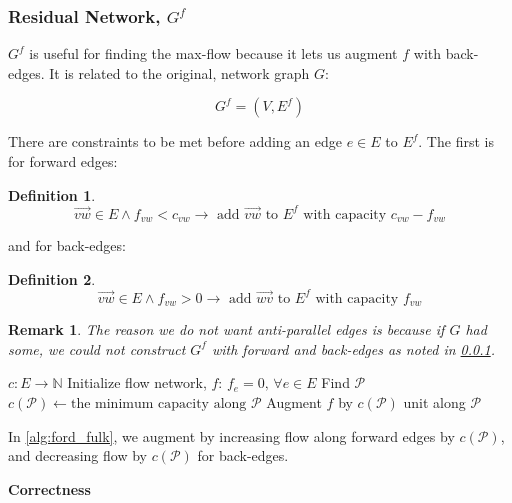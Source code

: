 \documentclass{article}
\newtheorem{remark}{Remark}
\theoremstyle{definition}
\newtheorem{definition}{Definition}[section]
\begin{document}
\subsubsection{Residual Network, $G^f$}
\label{residual_net}
$G^f$ is useful for finding the max-flow because it lets us augment $f$ with back-edges. It is related to the original, network graph $G$:

$$G^f = (V, E^f)$$

There are constraints to be met before adding an edge $e \in E$ to $E^f$. The first is for forward edges:

\begin{definition}
\label{def:add_unsat_2_resid}
$$\overrightarrow{vw} \in E \land f_{vw} < c_{vw} \to \text{ add } \overrightarrow{vw} \text { to } E^f \text { with capacity } c_{vw} - f_{vw}$$
\end{definition}

and for back-edges:

\begin{definition}
\label{def:add_back_edge_unsat_2_resid}
$$\overrightarrow{vw} \in E \land f_{vw} > 0 \to \text{ add } \overrightarrow{wv} \text { to } E^f \text { with capacity } f_{vw}$$
\end{definition}

\begin{remark}
The reason we do not want anti-parallel edges is because if $G$ had some, we could not construct $G^f$ with forward and back-edges as noted in \ref{residual_net}.
\end{remark}

\begin{algorithm}[H]
\caption{$FordFulkerson$}
\label{alg:ford_fulk}
\begin{algorithmic}[1]
	\REQUIRE $c : E \to \mathbb{N}$ 
	\STATE Initialize flow network, $f$: $f_e = 0, \, \forall e \in E$
		\STATE Find $\mathcal{P}$
		\STATE $c(\mathcal{P}) \gets \text{the minimum capacity along } \mathcal{P}$
		\STATE Augment $f$ by $c(\mathcal{P})$ unit along $\mathcal{P}$
	\ENDWHILE
\end{algorithmic}
\end{algorithm}

In \ref{alg:ford_fulk}, we augment by increasing flow along forward edges by $c(\mathcal{P})$, and decreasing flow by $c(\mathcal{P})$ for back-edges. 

\textbf{Correctness}
\end{document}

